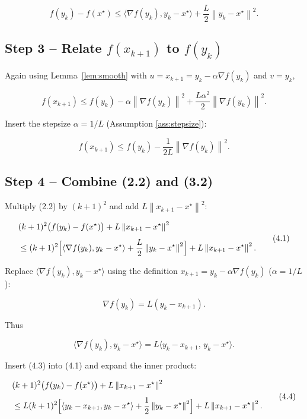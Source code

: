 \documentclass{article}
\newcommand{\grad}{\nabla}
\newcommand{\norm}[1]{\left\|#1\right\|}
\begin{document}
\[
f(y_k)-f(x^{\star})\le
\langle \grad f(y_k),y_k-x^{\star}\rangle
   +\frac{L}{2}\norm{y_k-x^{\star}}^{2}.
\tag{2.2}
\]

\subsection*{Step 3 – Relate \(f(x_{k+1})\) to \(f(y_k)\)}
Again using Lemma~\ref{lem:smooth} with \(u=x_{k+1}=y_k-\alpha\grad f(y_k)\) and
\(v=y_k\),

\[
f(x_{k+1})\le f(y_k)-\alpha\norm{\grad f(y_k)}^{2}
              +\frac{L\alpha^{2}}{2}\norm{\grad f(y_k)}^{2}.
\tag{3.1}
\]

Insert the stepsize \(\alpha=1/L\) (Assumption \ref{ass:stepsize}):

\[
f(x_{k+1})\le f(y_k)-\frac{1}{2L}\norm{\grad f(y_k)}^{2}.
\tag{3.2}
\]

\subsection*{Step 4 – Combine (2.2) and (3.2)}
Multiply (2.2) by \((k+1)^{2}\) and add \(L\norm{x_{k+1}-x^{\star}}^{2}\):

\[
\begin{aligned}
&(k+1)^{2}\bigl(f(y_k)-f(x^{\star})\bigr)
   +L\norm{x_{k+1}-x^{\star}}^{2} \\[4pt]
&\le (k+1)^{2}\Bigl[\langle \grad f(y_k),y_k-x^{\star}\rangle
      +\frac{L}{2}\norm{y_k-x^{\star}}^{2}\Bigr]
   +L\norm{x_{k+1}-x^{\star}}^{2}.
\end{aligned}
\tag{4.1}
\]

Replace \(\langle \grad f(y_k),y_k-x^{\star}\rangle\) using the definition
\(x_{k+1}=y_k-\alpha\grad f(y_k)\) (\(\alpha=1/L\)):

\[
\grad f(y_k)=L(y_k-x_{k+1}).
\tag{4.2}
\]

Thus

\[
\langle \grad f(y_k),y_k-x^{\star}\rangle
   =L\langle y_k-x_{k+1},\,y_k-x^{\star}\rangle.
\tag{4.3}
\]

Insert (4.3) into (4.1) and expand the inner product:

\[
\begin{aligned}
&(k+1)^{2}\bigl(f(y_k)-f(x^{\star})\bigr)
   +L\norm{x_{k+1}-x^{\star}}^{2}\\[4pt]
&\le L(k+1)^{2}\Bigl[\langle y_k-x_{k+1},y_k-x^{\star}\rangle
       +\frac{1}{2}\norm{y_k-x^{\star}}^{2}\Bigr]
   +L\norm{x_{k+1}-x^{\star}}^{2}.
\end{aligned}
\tag{4.4}
\]
\end{document}
